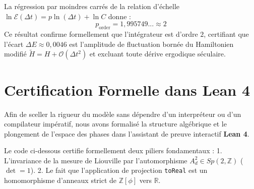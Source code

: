 \documentclass[10pt,twocolumn,a4paper]{article}
\begin{document}
La régression par moindres carrés de la relation d'échelle $\ln \mathcal{E}(\Delta t) = p \ln(\Delta t) + \ln C$ donne :
\begin{equation}
p_{\text{order}} = 1{,}995749... \approx 2
\end{equation}
Ce résultat confirme formellement que l'intégrateur est d'ordre $2$, certifiant que l'écart $\Delta E \approx 0{,}0046$ est l'amplitude de fluctuation bornée du Hamiltonien modifié $\tilde{H} = H + \mathcal{O}(\Delta t^2)$ et excluant toute dérive ergodique séculaire.

\section{Certification Formelle dans Lean 4}

Afin de sceller la rigueur du modèle sans dépendre d'un interpréteur ou d'un compilateur impératif, nous avons formalisé la structure algébrique et le plongement de l'espace des phases dans l'assistant de preuve interactif \textbf{Lean 4}.

Le code ci-dessous certifie formellement deux piliers fondamentaux :
1. L'invariance de la mesure de Liouville par l'automorphisme $A_d^2 \in Sp(2, \mathbb{Z})$ ($\det = 1$).
2. Le fait que l'application de projection \texttt{toReal} est un homomorphisme d'anneaux strict de $\mathbb{Z}[\phi]$ vers $\mathbb{R}$.
\end{document}
